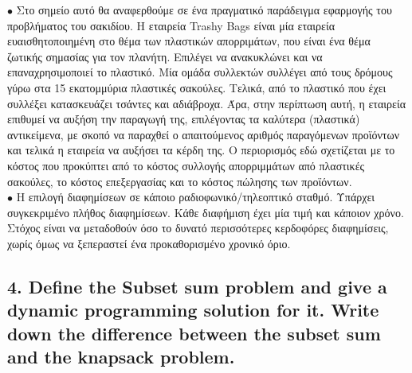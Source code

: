\documentclass[12pt]{article}
\begin{document}
\(\bullet\) Στο σημείο αυτό θα αναφερθούμε σε ένα πραγματικό παράδειγμα εφαρμογής του προβλήματος του σακιδίου. Η εταιρεία Trashy Bags είναι μία εταιρεία ευαισθητοποιημένη στο θέμα των πλαστικών απορριμάτων, που είναι ένα θέμα ζωτικής σημασίας για τον πλανήτη. Επιλέγει να ανακυκλώνει και να επαναχρησιμοποιεί το πλαστικό. Μία ομάδα συλλεκτών συλλέγει από τους δρόμους γύρω στα 15 εκατομμύρια πλαστικές σακούλες. Τελικά, από το πλαστικό που έχει συλλέξει κατασκευάζει τσάντες και αδιάβροχα. Άρα, στην περίπτωση αυτή, η εταιρεία επιθυμεί να αυξήση την παραγωγή της, επιλέγοντας τα καλύτερα (πλαστικά) αντικείμενα, με σκοπό να παραχθεί ο απαιτούμενος  αριθμός  παραγόμενων προϊόντων και τελικά η εταιρεία να αυξήσει τα κέρδη της. Ο περιορισμός εδώ σχετίζεται με το κόστος που προκύπτει από το κόστος συλλογής απορριμμάτων από πλαστικές σακούλες,  το  κόστος  επεξεργασίας  και  το  κόστος  πώλησης  των προϊόντων. \\

\(\bullet\) Η επιλογή διαφημίσεων σε κάποιο ραδιοφωνικό/τηλεοπτικό σταθμό. Υπάρχει συγκεκριμένο πλήθος διαφημίσεων. Κάθε διαφήμιση έχει μία τιμή και κάποιον χρόνο. Στόχος είναι να μεταδοθούν όσο το δυνατό περισσότερες κερδοφόρες διαφημίσεις, χωρίς όμως να ξεπεραστεί ένα προκαθορισμένο χρονικό όριο. \\

\vspace{2in}

\pagebreak

\subsection*{4. Define the Subset sum problem and give a dynamic programming solution for
	it. Write down the difference between the subset sum and the knapsack problem.}



\vspace{2in}

\pagebreak
\end{document}
